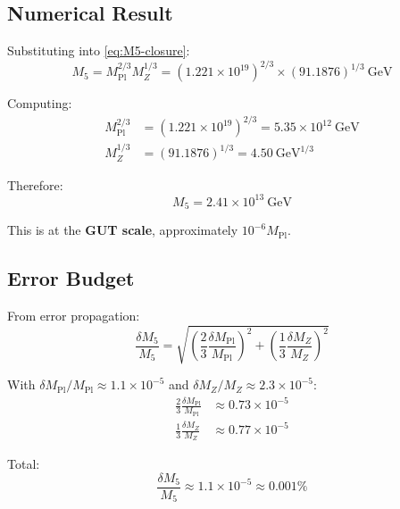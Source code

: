 \documentclass[11pt,a4paper]{article}
\newcommand{\Mpl}{M_{\mathrm{Pl}}}
\newcommand{\Mfive}{M_5}
\newcommand{\MZ}{M_Z}
\begin{document}
\subsection{Numerical Result}

Substituting into \eqref{eq:M5-closure}:
\begin{equation}
\Mfive = \Mpl^{2/3} \MZ^{1/3}
= (1.221 \times 10^{19})^{2/3} \times (91.1876)^{1/3}~\mathrm{GeV}
\label{eq:M5-calculation}
\end{equation}

Computing:
\begin{align}
\Mpl^{2/3} &= (1.221 \times 10^{19})^{2/3} = 5.35 \times 10^{12}~\mathrm{GeV}
\label{eq:Mpl-power} \\
\MZ^{1/3} &= (91.1876)^{1/3} = 4.50~\mathrm{GeV}^{1/3}
\label{eq:MZ-power}
\end{align}

Therefore:
\begin{equation}
\boxed{\Mfive = 2.41 \times 10^{13}~\mathrm{GeV}}
\label{eq:M5-result}
\end{equation}

This is at the \textbf{GUT scale}, approximately $10^{-6} \Mpl$.

\subsection{Error Budget}

From error propagation:
\begin{equation}
\frac{\delta\Mfive}{\Mfive} = \sqrt{\left(\frac{2}{3}\frac{\delta\Mpl}{\Mpl}\right)^2
+ \left(\frac{1}{3}\frac{\delta\MZ}{\MZ}\right)^2}
\label{eq:error-propagation}
\end{equation}

With $\delta\Mpl/\Mpl \approx 1.1 \times 10^{-5}$ and
$\delta\MZ/\MZ \approx 2.3 \times 10^{-5}$:
\begin{align}
\frac{2}{3}\frac{\delta\Mpl}{\Mpl} &\approx 0.73 \times 10^{-5}
\label{eq:Mpl-contrib} \\
\frac{1}{3}\frac{\delta\MZ}{\MZ} &\approx 0.77 \times 10^{-5}
\label{eq:MZ-contrib}
\end{align}

Total:
\begin{equation}
\frac{\delta\Mfive}{\Mfive} \approx 1.1 \times 10^{-5} \approx 0.001\%
\label{eq:total-error}
\end{equation}

\end{document}

